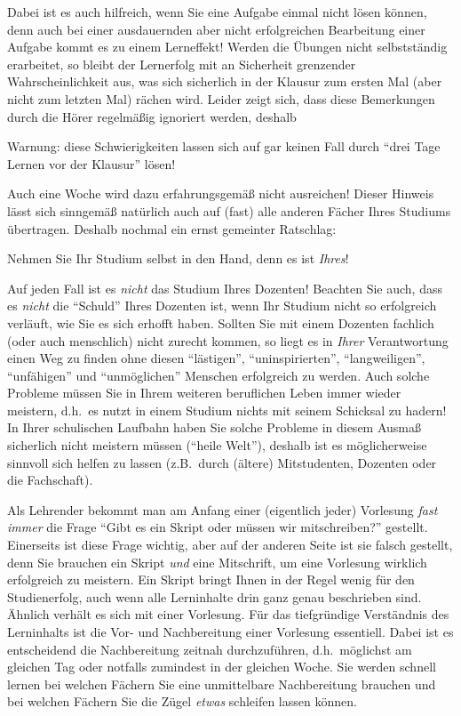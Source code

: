 Dabei ist es auch hilfreich, wenn Sie eine Aufgabe einmal nicht lösen können,
denn auch bei einer ausdauernden aber nicht erfolgreichen Bearbeitung
einer Aufgabe kommt es zu einem Lerneffekt! Werden die Übungen nicht
selbstständig erarbeitet, so bleibt der Lernerfolg mit an Sicherheit
grenzender Wahrscheinlichkeit aus, was sich sicherlich in der Klausur
zum ersten Mal (aber nicht zum letzten Mal) rächen wird. Leider zeigt
sich, dass diese Bemerkungen durch die Hörer regelmäßig ignoriert
werden, deshalb

\begin{center}
\large Warnung:  diese Schwierigkeiten lassen sich auf gar keinen Fall durch 
"`drei Tage Lernen vor der Klausur"' lösen!
\end{center}

Auch eine Woche wird dazu erfahrungsgemäß nicht ausreichen! Dieser
Hinweis lässt sich sinngemäß natürlich auch auf (fast) alle anderen
Fächer Ihres Studiums übertragen. Deshalb nochmal ein ernst gemeinter Ratschlag:
\begin{center}
	\large Nehmen Sie Ihr Studium selbst in den Hand, denn es ist \emph{Ihres}!
\end{center}
Auf jeden Fall ist es \emph{nicht} das Studium Ihres Dozenten! Beachten Sie auch, dass es 
\emph{nicht} die "`Schuld"' Ihres Dozenten ist, wenn Ihr Studium nicht so erfolgreich
verläuft, wie Sie es sich erhofft haben. Sollten Sie mit einem Dozenten fachlich (oder 
auch menschlich) nicht zurecht kommen, so liegt es in \emph{Ihrer} Verantwortung einen Weg
zu finden ohne diesen "`lästigen"', "`uninspirierten"', "`langweiligen"', "`unfähigen"' und 
"`unmöglichen"' Menschen erfolgreich zu werden. Auch solche 
Probleme müssen Sie in Ihrem weiteren beruflichen Leben immer wieder meistern, d.h.~es nutzt
in einem Studium nichts mit seinem Schicksal zu hadern! In Ihrer schulischen Laufbahn
haben Sie solche Probleme in diesem Ausmaß sicherlich nicht meistern müssen ("`heile Welt"'), 
deshalb ist es möglicherweise sinnvoll sich helfen zu lassen (z.B.~durch (ältere) Mitstudenten, 
Dozenten oder die Fachschaft).

\goodbreak
\bigskip

Als Lehrender bekommt man am Anfang einer (eigentlich jeder) Vorlesung \emph{fast immer} die 
Frage "`Gibt es ein Skript oder müssen wir mitschreiben?"' gestellt. Einerseits ist diese Frage
wichtig, aber auf der anderen Seite ist sie falsch gestellt, denn Sie brauchen ein Skript
\emph{und} eine Mitschrift, um eine Vorlesung wirklich erfolgreich zu meistern. Ein Skript 
bringt Ihnen in der Regel wenig für den Studienerfolg, auch wenn alle Lerninhalte drin ganz genau 
beschrieben sind. Ähnlich verhält es sich mit einer Vorlesung. Für das tiefgründige Verständnis des 
Lerninhalts ist die Vor- und Nachbereitung einer Vorlesung essentiell. Dabei ist es entscheidend die
Nachbereitung zeitnah durchzuführen, d.h.~möglichst am gleichen Tag oder notfalls
zumindest in der gleichen Woche. Sie werden schnell lernen bei welchen Fächern Sie eine
unmittelbare Nachbereitung brauchen und bei welchen Fächern Sie die Zügel 
\emph{etwas} schleifen lassen können.

